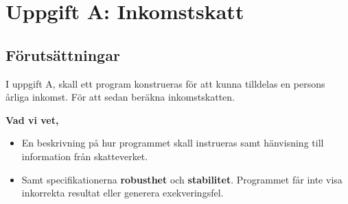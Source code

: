 \documentclass[../main.tex]{subfiles}
\begin{document}
\section{Uppgift A: Inkomstskatt}

\subsection{Förutsättningar}

I uppgift A, skall ett program konstrueras för att kunna tilldelas en persons årliga inkomst. För att sedan beräkna inkomstskatten.
\begin{tcolorbox}[colback=gray!5!white,colframe=black!75!black]

\textbf{Vad vi vet,} 

\begin{itemize}

    \item En beskrivning på hur programmet skall instrueras samt hänvisning till information från skatteverket. 
    
    \item Samt specifikationerna \textbf{robusthet} och \textbf{stabilitet}.
    Programmet får inte visa inkorrekta resultat eller generera exekveringsfel.
    
\end{itemize}

\end{tcolorbox}

\newpage
\end{document}
